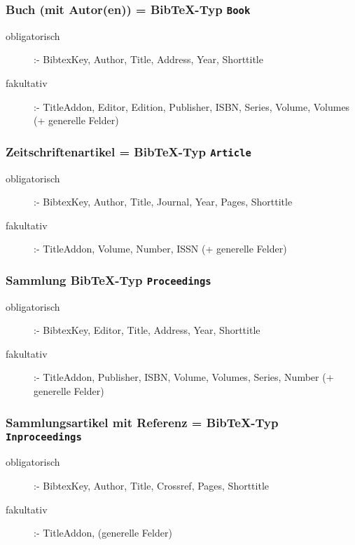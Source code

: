 \subsubsection{Buch (mit Autor(en)) = Bib\TeX-Typ \texttt{Book} } 

  \begin{description}
  \item[obligatorisch] :- \textsf{BibtexKey, Author, Title, Address, Year,  Shorttitle}
  \item[fakultativ] :- \textsf{TitleAddon, Editor, Edition, Publisher, ISBN, Series, Volume,
  Volumes (+ generelle Felder)}
  \end{description}

\subsubsection{Zeitschriftenartikel = Bib\TeX-Typ \texttt{Article} }

  \begin{description}
  \item[obligatorisch] :- \textsf{BibtexKey, Author, Title, Journal, Year, Pages, Shorttitle}
  \item[fakultativ] :- \textsf{TitleAddon, Volume, Number, ISSN (+ generelle Felder)}
  \end{description}

\subsubsection{Sammlung  Bib\TeX-Typ \texttt{Proceedings}}

  \begin{description}
  \item[obligatorisch] :- \textsf{BibtexKey, Editor, Title, Address, Year, Shorttitle}
  \item[fakultativ] :- \textsf{TitleAddon, Publisher, ISBN, Volume, Volumes, Series,
  Number (+ generelle Felder)}
  \end{description}

\subsubsection{Sammlungsartikel mit Referenz = Bib\TeX-Typ \texttt{Inproceedings} }

  \begin{description}
  \item[obligatorisch] :- \textsf{BibtexKey, Author, Title, Crossref, Pages, Shorttitle}
  \item[fakultativ] :- \textsf{TitleAddon, (generelle Felder)}
  \end{description}
  
